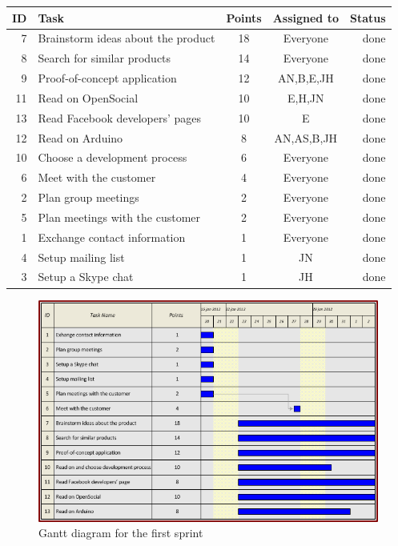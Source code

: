 \begin{table}[ht!]
\begin{tabular}{ | r | l | c | c | r | }

\hline
\textbf{ID} & \textbf{Task} & \textbf{Points} & \textbf{Assigned to} & \textbf{Status} \\
\hline

 7 & Brainstorm ideas about the product		& 18 & Everyone		& done \\
\hline
 8 & Search for similar products			& 14 & Everyone		& done \\
\hline
 9 & Proof-of-concept application			& 12 & AN,B,E,JH	& done \\
\hline
11 & Read on OpenSocial						& 10 & E,H,JN		& done \\
\hline
13 & Read Facebook developers' pages		& 10  & E			& done\\
\hline
12 & Read on Arduino						& 8  & AN,AS,B,JH	& done \\
\hline
10 & Choose a development process			& 6  & Everyone		& done \\
\hline
 6 & Meet with the customer					& 4  & Everyone		& done \\
\hline
 2 & Plan group meetings					& 2  & Everyone		& done \\
\hline
 5 & Plan meetings with the customer		& 2  & Everyone		& done \\
\hline
 1 & Exchange contact information			& 1  & Everyone		& done \\
\hline
 4 & Setup mailing list						& 1  & JN			& done \\
\hline
 3 & Setup a Skype chat						& 1  & JH			& done \\
\hline

\end{tabular}
\end{table}

\newpage

\begin{figure}[h!]
\centering \includegraphics[scale=0.8]{img/sprints-gantt1.png}
\caption{Gantt diagram for the first sprint}
\label{fig:sprints-gantt1}
\end{figure}

